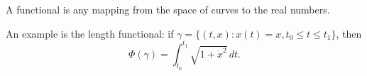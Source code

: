 A functional is any mapping from the space of curves to the real numbers.

An example is the length functional: if $\gamma = \{(t, x): x(t) = x, t_0 \leq t \leq t_1\}$, then
$$\Phi(\gamma) = \int_{t_0}^{t_1} \sqrt{1 + \dot{x}^2} \, dt.$$
